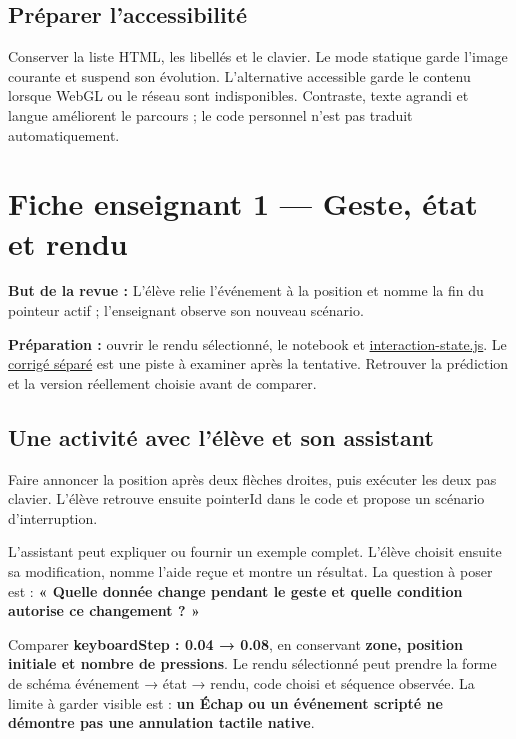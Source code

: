 \documentclass[
  canadien,
  11pt,
  a4paper,
]{report}
\begin{document}
\section{Préparer l'accessibilité}\label{pruxe9parer-laccessibilituxe9}

Conserver la liste HTML, les libellés et le clavier. Le mode statique
garde l'image courante et suspend son évolution. L'alternative
accessible garde le contenu lorsque WebGL ou le réseau sont
indisponibles. Contraste, texte agrandi et langue améliorent le parcours
; le code personnel n'est pas traduit automatiquement.

\chapter{Fiche enseignant 1 --- Geste, état et
rendu}\label{fiche-enseignant-1-geste-uxe9tat-et-rendu}

\textbf{But de la revue :} L'élève relie l'événement à la position et
nomme la fin du pointeur actif ; l'enseignant observe son nouveau
scénario.

\textbf{Préparation :} ouvrir le rendu sélectionné, le notebook et
\href{../../frontend/module-1/interaction-state.js}{interaction-state.js}.
Le \href{../../notebooks/instructor/module-1.ipynb}{corrigé séparé} est
une piste à examiner après la tentative. Retrouver la prédiction et la
version réellement choisie avant de comparer.

\section{Une activité avec l'élève et son
assistant}\label{une-activituxe9-avec-luxe9luxe8ve-et-son-assistant}

Faire annoncer la position après deux flèches droites, puis exécuter les
deux pas clavier. L'élève retrouve ensuite pointerId dans le code et
propose un scénario d'interruption.

L'assistant peut expliquer ou fournir un exemple complet. L'élève
choisit ensuite sa modification, nomme l'aide reçue et montre un
résultat. La question à poser est : \textbf{« Quelle donnée change
pendant le geste et quelle condition autorise ce changement ? »}

Comparer \textbf{keyboardStep : 0.04 → 0.08}, en conservant
\textbf{zone, position initiale et nombre de pressions}. Le rendu
sélectionné peut prendre la forme de schéma événement → état → rendu,
code choisi et séquence observée. La limite à garder visible est :
\textbf{un Échap ou un événement scripté ne démontre pas une annulation
tactile native}.
\end{document}

